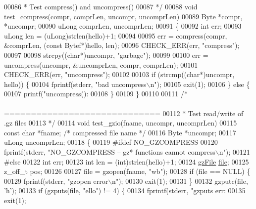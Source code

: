 \begin{DoxyCode}
{00086 \textcolor{comment}{ * Test compress() and uncompress()}
00087 \textcolor{comment}{ */}
00088 \textcolor{keywordtype}{void} test\_compress(compr, comprLen, uncompr, uncomprLen)
00089     Byte *compr, *uncompr;
00090     uLong comprLen, uncomprLen;
00091 \{
00092     \textcolor{keywordtype}{int} err;
00093     uLong len = (uLong)strlen(hello)+1;
00094 
00095     err = compress(compr, &comprLen, (\textcolor{keyword}{const} Bytef*)hello, len);
00096     CHECK\_ERR(err, \textcolor{stringliteral}{"compress"});
00097 
00098     strcpy((\textcolor{keywordtype}{char}*)uncompr, \textcolor{stringliteral}{"garbage"});
00099 
00100     err = uncompress(uncompr, &uncomprLen, compr, comprLen);
00101     CHECK\_ERR(err, \textcolor{stringliteral}{"uncompress"});
00102 
00103     \textcolor{keywordflow}{if} (strcmp((\textcolor{keywordtype}{char}*)uncompr, hello)) \{
00104         fprintf(stderr, \textcolor{stringliteral}{"bad uncompress\(\backslash\)n"});
00105         exit(1);
00106     \} \textcolor{keywordflow}{else} \{
00107         printf(\textcolor{stringliteral}{"uncompress(): %
00108     \}
00109 \}
00110 
00111 \textcolor{comment}{/* ===========================================================================}
00112 \textcolor{comment}{ * Test read/write of .gz files}
00113 \textcolor{comment}{ */}
00114 \textcolor{keywordtype}{void} test\_gzio(fname, uncompr, uncomprLen)
00115     \textcolor{keyword}{const} \textcolor{keywordtype}{char} *fname; \textcolor{comment}{/* compressed file name */}
00116     Byte *uncompr;
00117     uLong uncomprLen;
00118 \{
00119 \textcolor{preprocessor}{#ifdef NO\_GZCOMPRESS}
00120     fprintf(stderr, \textcolor{stringliteral}{"NO\_GZCOMPRESS -- gz* functions cannot compress\(\backslash\)n"});
00121 \textcolor{preprocessor}{#else}
00122     \textcolor{keywordtype}{int} err;
00123     \textcolor{keywordtype}{int} len = (int)strlen(hello)+1;
00124     \hyperlink{structgz_file__s}{gzFile} \hyperlink{structfile}{file};
00125     z\_off\_t pos;
00126 
00127     file = gzopen(fname, \textcolor{stringliteral}{"wb"});
00128     \textcolor{keywordflow}{if} (file == NULL) \{
00129         fprintf(stderr, \textcolor{stringliteral}{"gzopen error\(\backslash\)n"});
00130         exit(1);
00131     \}
00132     gzputc(file, \textcolor{charliteral}{'h'});
00133     \textcolor{keywordflow}{if} (gzputs(file, \textcolor{stringliteral}{"ello"}) != 4) \{
00134         fprintf(stderr, \textcolor{stringliteral}{"gzputs err: %
00135         exit(1);
}}}
\end{DoxyCode}
